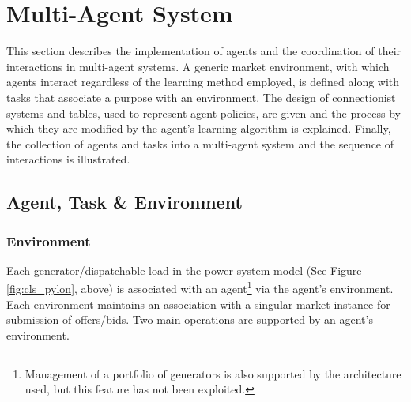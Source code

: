 

\newpage
\section{Multi-Agent System}
\label{sec:mas}
This section describes the implementation of agents and the coordination of
their interactions in multi-agent systems.  A generic market environment, with
which agents interact regardless of the learning method employed, is defined
along with tasks that associate a purpose with an environment.  The design of
connectionist systems and tables, used to represent agent policies, are given
and the process by which they are modified by the agent's learning algorithm is
explained.  Finally, the collection of agents and tasks into a multi-agent
system and the sequence of interactions is illustrated.

\subsection{Agent, Task \& Environment}

\subsubsection{Environment}
Each generator/dispatchable load in the power system model (See Figure
\ref{fig:cls_pylon}, above) is associated with an agent\footnote{Management of
a portfolio of generators is also supported by the architecture used, but this
feature has not been exploited.} via the agent's environment.  Each environment
maintains an association with a singular market instance for submission of
offers/bids.  Two main operations are supported by an agent's environment.

